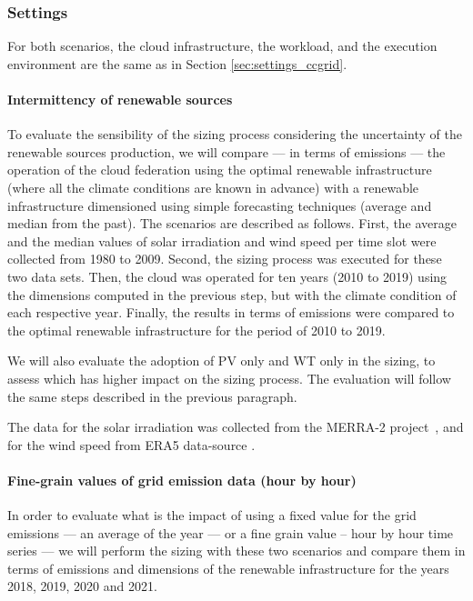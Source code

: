 \subsubsection{Settings}


For both scenarios, the cloud infrastructure, the workload, and the execution environment are the same as in Section  \ref{sec:settings_ccgrid}.

\paragraph{Intermittency of renewable sources}

To evaluate the sensibility of the sizing process considering the uncertainty of the renewable sources production, we will compare --- in terms of  emissions ---  the operation of the cloud federation using the optimal renewable infrastructure (where all the climate conditions are known in advance) with a renewable infrastructure dimensioned using simple forecasting techniques (average and median from the past). The scenarios are described as follows. First, the average and the median values of solar irradiation and wind speed per time slot were collected from 1980 to 2009. Second, the sizing process was executed for these two data sets. Then, the cloud was operated for ten years (2010 to 2019) using the dimensions computed in the previous step, but with the climate condition of each respective year. Finally, the results in terms of  emissions were compared to the optimal renewable infrastructure for the period of 2010 to 2019.

We will also evaluate the adoption of PV only and WT only in the sizing, to assess which has higher impact on the sizing process. The evaluation will follow the same steps described in the previous paragraph.

The data for the solar irradiation was collected from the MERRA-2 project~\cite{GELARO2017MERRA2}, and for the wind speed from ERA5 data-source \cite{era5_wind_2022}.

\paragraph{Fine-grain values of grid emission data (hour by hour)}

In order to evaluate what is the impact of using a fixed value for the grid emissions --- an average of the year ---  or a fine grain value --  hour by hour time series ---  we will perform the sizing with these two scenarios and compare them in terms of  emissions and dimensions of the renewable infrastructure for the years 2018, 2019, 2020 and 2021.

